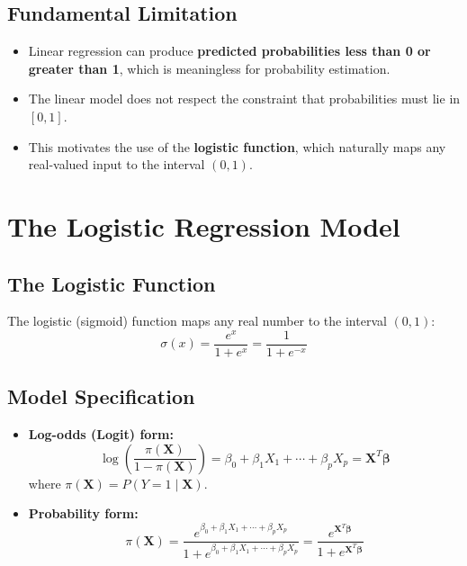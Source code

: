 \documentclass{article}
\begin{document}
\subsection{Fundamental Limitation}
\begin{itemize}
    \item Linear regression can produce \textbf{predicted probabilities less than 0 or greater than 1}, which is meaningless for probability estimation.
    \item The linear model does not respect the constraint that probabilities must lie in $[0, 1]$.
    \item This motivates the use of the \textbf{logistic function}, which naturally maps any real-valued input to the interval $(0, 1)$.
\end{itemize}

\section{The Logistic Regression Model}

\subsection{The Logistic Function}
The logistic (sigmoid) function maps any real number to the interval $(0, 1)$:
$$\sigma(x) = \frac{e^x}{1 + e^x} = \frac{1}{1 + e^{-x}}$$

\subsection{Model Specification}
\begin{itemize}
    \item \textbf{Log-odds (Logit) form:}
    $$\log\left(\frac{\pi(\mathbf{X})}{1 - \pi(\mathbf{X})}\right) = \beta_0 + \beta_1 X_1 + \cdots + \beta_p X_p = \mathbf{X}^T\boldsymbol{\beta}$$
    where $\pi(\mathbf{X}) = P(Y = 1 \mid \mathbf{X})$.
    \item \textbf{Probability form:}
    $$\pi(\mathbf{X}) = \frac{e^{\beta_0 + \beta_1 X_1 + \cdots + \beta_p X_p}}{1 + e^{\beta_0 + \beta_1 X_1 + \cdots + \beta_p X_p}} = \frac{e^{\mathbf{X}^T\boldsymbol{\beta}}}{1 + e^{\mathbf{X}^T\boldsymbol{\beta}}}$$
\end{itemize}
\end{document}
